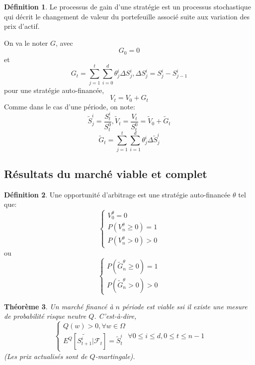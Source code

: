 \documentclass{article}
\theoremstyle{plain}
\newtheorem{thm}{Th\'eor\`eme}[section]
\theoremstyle{definition}
\newtheorem{defn}[thm]{D\'efinition}
\begin{document}
\begin{defn}
	Le processus de gain d'une strat\'egie est un processus stochastique qui d\'ecrit le changement de valeur du portefeuille associ\'e suite aux variation des prix d'actif.

\end{defn}

On va le noter $G$, avec
\begin{equation}
	G_0=0
\end{equation}
et
\begin{equation}
	G_t=\sum_{j=1}^t\sum_{i=0}^d \theta_j^i\Delta S_j^i,\Delta S_j^i=S_j^i-S_{j-1}^i
\end{equation}
pour une strat\'egie auto-financ\'ee,
\begin{equation}
V_t=V_0+G_t
\end{equation}
Comme dans le cas d'une p\'eriode, on note:
\begin{equation}
\tilde{S}_j^i=\frac{S_t^i}{S_t^0},\tilde{V}_t=\frac{V_t}{S_t^0}=\tilde{V}_0+\tilde{G}_t
\end{equation}
\begin{equation}
\tilde{G}_t=\sum_{j=1}^t\sum_{i=1}^d \theta_j^i \Delta \tilde{S}_j^i
\end{equation}

\subsection{R\'esultats du march\'e viable et complet}

\begin{defn}
	Une opportunit\'e d'arbitrage est une strat\'egie auto-financ\'ee $\theta$ tel que:
\begin{equation}
\left\{\begin{array}{l}
V_0^\theta=0 \\
P(V_n^\theta \geq 0)=1\\ 
P(V_n^\theta >0)>0
\end{array}\right.
\end{equation}
ou
\begin{equation}
\left\{\begin{array}{rcl}
P(\tilde{G}_n^\theta \geq 0)=1\\
P(\tilde{G}_n^\theta>0)>0
\end{array}\right.
\end{equation}
\end{defn}

\begin{thm}
	Un march\'e financ\'e \`a $n$ p\'eriode est viable ssi il existe une mesure de probabilit\'e risque neutre $Q$. C'est-\`a-dire,
\begin{equation}
\left\{\begin{array}{l}
Q(w)>0,\forall w\in\Omega\\
E^Q[\tilde{S_{t+1}^i}|\mathcal{F}_t]=\tilde{S}_t^i
\end{array}\right.
\forall 0 \leq i \leq d,0\leq t\leq n-1
\end{equation}
(Les prix actualis\'es sont de $Q$-martingale).
\end{thm}
\end{document}
